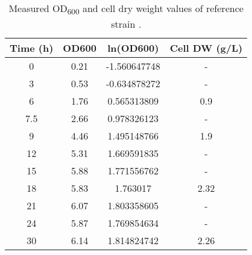 \begin{table}[H]
\caption[Measured OD\textsubscript{600} and cell dry weight values of reference strain]{Measured OD\textsubscript{600} and cell dry weight values of reference strain \cite{surmeli2019evolutionary}.}
\begin{center}
  \begin{tabular}{|c|c|c|c|}
 \hline
  \textbf{Time (h)} & \textbf{OD600} & \textbf{ln(OD600)} & \textbf{Cell DW (g/L)} \\
  \hline
  0                 & 0.21           & -1.560647748       & -                      \\ \hline
  3                 & 0.53           & -0.634878272       & -                      \\ \hline
  6                 & 1.76           & 0.565313809        & 0.9                    \\ \hline
  7.5               & 2.66           & 0.978326123        & -                      \\ \hline
  9                 & 4.46           & 1.495148766        & 1.9                    \\ \hline
  12                & 5.31           & 1.669591835        & -                      \\ \hline
  15                & 5.88           & 1.771556762        & -                      \\ \hline
  18                & 5.83           & 1.763017           & 2.32                   \\ \hline
  21                & 6.07           & 1.803358605        & -                      \\ \hline
  24                & 5.87           & 1.769854634        & -                      \\ \hline
  30                & 6.14           & 1.814824742        & 2.26                   \\
   \hline
  \end{tabular}
\label{table:experimental_OD600s_and_growths}
\end{center}
\end{table}
